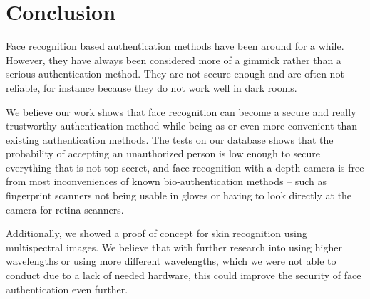 \chapter{Conclusion}
    Face recognition based authentication methods have been around for a while. However,
    they have always been considered more of a gimmick rather than a serious
    authentication method. They are not secure enough and are often not reliable,
    for instance because they do not work well in dark rooms.

    We believe our work shows that face recognition can become a secure and
    really trustworthy authentication method while being as or even more
    convenient than existing authentication methods.
    The tests on our database shows that the probability of accepting
    an unauthorized person is low enough to secure everything that is not top secret,
    and face recognition with a depth camera is free from most inconveniences
    of known bio-authentication methods -- such as fingerprint scanners not
    being usable in gloves or having to look directly at the camera for
    retina scanners.

    Additionally, we showed a proof of concept for skin recognition using
    multispectral images. We believe that with further research into
    using higher wavelengths or using more different wavelengths,
    which we were not able to conduct due to a lack of needed hardware,
    this could improve the security of face authentication even further.
